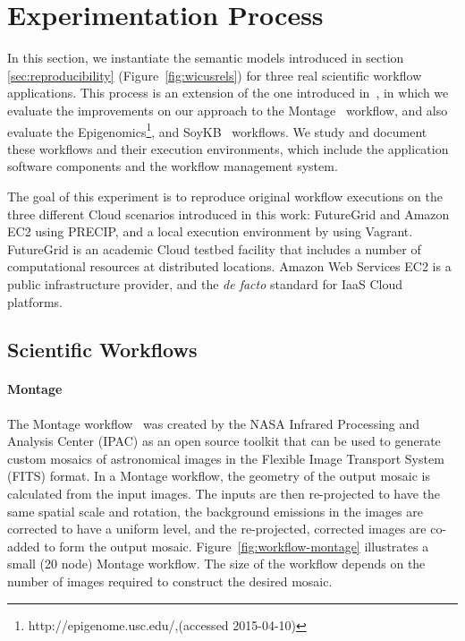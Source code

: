 \section{Experimentation Process}
\label{sec:experiment}


In this section, we instantiate the semantic models introduced in section \ref{sec:reproducibility}
(Figure~\ref{fig:wicusrels}) for three real scientific workflow applications. 
This process is an extension of the one introduced
 in~\cite{SantanaPerez-REPPAR-2014}, in which we evaluate the improvements on our
 approach to the Montage~\cite{Montage} workflow, and also evaluate the
 Epigenomics\footnote{http://epigenome.usc.edu/,(accessed 2015-04-10)}, and SoyKB~\cite{soybean, Joshi01012014} workflows.
We study and document these workflows and their execution environments, which include the application software components 
and the workflow management system.

The goal of this experiment is to reproduce original workflow executions on the three different 
Cloud scenarios introduced in this work: FutureGrid and Amazon EC2
using PRECIP, and a local execution environment by using Vagrant. 
FutureGrid is an academic Cloud testbed facility that includes a number of computational 
resources at distributed locations. Amazon Web Services EC2 is a public infrastructure 
provider, and the \emph{de facto} standard for IaaS Cloud platforms. 


\subsection{Scientific Workflows}

\paragraph{\textbf{Montage}}
The Montage workflow~\cite{Montage} was created by the NASA Infrared Processing 
and Analysis Center (IPAC) as an open source toolkit that can be used to generate 
custom mosaics of astronomical images in the Flexible Image Transport System (FITS) 
format. In a Montage workflow, the geometry of the output mosaic is calculated from the 
input images. The inputs are then re-projected to have the same spatial scale and rotation, 
the background emissions in the images are corrected to have a uniform level, and the 
re-projected, corrected images are co-added to form the output mosaic. 
Figure~\ref{fig:workflow-montage} illustrates a small (20 node) Montage workflow. The 
size of the workflow depends on the number of images required to construct the desired 
mosaic.

